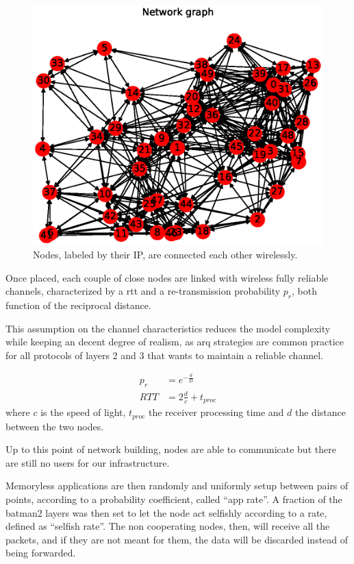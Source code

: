 \documentclass[conference,10.5pt]{IEEEtran}
\begin{document}
\begin{figure}[h]
  \centering
  \includegraphics[width=\linewidth]{figures/example_graph}
  \caption{Nodes, labeled by their IP, are connected each other wirelessly.}
  \label{fig:nodes}
\end{figure}

Once placed, each couple of close nodes are linked with wireless fully reliable channels, characterized by a \gls{rtt} and a re-transmission probability $p_r$, both function of the reciprocal distance.

This assumption on the channel characteristics reduces the model complexity while keeping an decent degree of realism, as \gls{arq} strategies are common practice for all protocols of layers 2 and 3 that wants to maintain a reliable channel.

\begin{equation}
  \begin{split}
    p_r & = e^{-\frac{d}{D}} \\
    RTT &= 2 \frac{d}{c} + t_{proc}
  \end{split}
\end{equation}
where $c$ is the speed of light, $t_{proc}$ the receiver processing time and $d$ the distance between the two nodes.
\smallskip

Up to this point of network building, nodes are able to communicate but there are still no users for our infrastructure.

Memoryless applications are then randomly and uniformly setup between pairs of points, according to a probability coefficient, called ``app rate''.
A fraction of the \gls{batman2} layers was then set to let the node act selfishly according to a rate, defined as ``selfish rate''. The non cooperating nodes, then, will receive all the packets, and if they are not meant for them, the data will be discarded instead of being forwarded.
\end{document}
